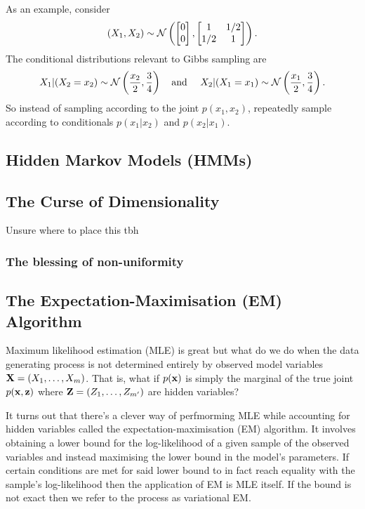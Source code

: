 \documentclass[11pt]{article}
\begin{document}
\begin{appendices}
As an example, consider
$$
(X_1,X_2)
\sim
\mathcal{N}\left(\begin{bmatrix} 0 \\ 0 \end{bmatrix}, \begin{bmatrix}1 & 1/2\\ 1/2 & 1\end{bmatrix}\right).
$$
The conditional distributions relevant to Gibbs sampling are
$$
X_1|(X_2=x_2)\sim\mathcal{N}\l(\frac{x_2}{2},\frac{3}{4}\r)
\hfill
\quad\text{and }\quad
X_2|(X_1=x_1)\sim\mathcal{N}\l(\frac{x_1}{2},\frac{3}{4}\r).
$$
So instead of sampling according to the joint $p(x_1,x_2)$, repeatedly sample according to conditionals $p(x_1|x_2)$ and $p(x_2|x_1)$.

\subsection{Hidden Markov Models (HMMs)}

\subsection{The Curse of Dimensionality}
Unsure where to place this tbh

\subsubsection{The blessing of non-uniformity}

\subsection{The Expectation-Maximisation (EM) Algorithm}
Maximum likelihood estimation (MLE) is great but what do we do when the data generating process is not determined entirely by observed model variables $\mathbf{X}=(X_1,\dots,X_m)$. That is, what if $p(\mathbf{x})$ is simply the marginal of the true joint $p(\mathbf{x},\mathbf{z})$ where $\mathbf{Z}=(Z_1,\dots,Z_{m'})$ are hidden variables?

It turns out that there's a clever way of perfmorming MLE while accounting for hidden variables called the expectation-maximisation (EM) algorithm. It involves obtaining a lower bound for the log-likelihood of a given sample of the observed variables and instead maximising the lower bound in the model's parameters. If certain conditions are met for said lower bound to in fact reach equality with the sample's log-likelihood then the application of EM is MLE itself. If the bound is not exact then we refer to the process as variational EM.


\end{appendices}
\end{document}
